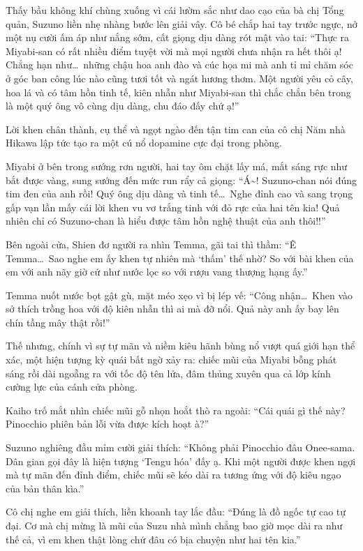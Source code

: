 \documentclass[../main.tex]{subfiles}
\begin{document}
Thấy bầu không khí chùng xuống vì cái lườm sắc như dao cạo của bà chị Tổng quản, Suzuno liền nhẹ nhàng bước lên giải vây. Cô bé chắp hai tay trước ngực, nở một nụ cười ấm áp như nắng sớm, cất giọng dịu dàng rót mật vào tai: ``Thực ra Miyabi-san có rất nhiều điểm tuyệt vời mà mọi người chưa nhận ra hết thôi ạ! Chẳng hạn như\dots\ những chậu hoa anh đào và cúc họa mi mà anh tỉ mỉ chăm sóc ở góc ban công lúc nào cũng tươi tốt và ngát hương thơm. Một người yêu cỏ cây, hoa lá và có tâm hồn tinh tế, kiên nhẫn như Miyabi-san thì chắc chắn bên trong là một quý ông vô cùng dịu dàng, chu đáo đấy chứ ạ!''

Lời khen chân thành, cụ thể và ngọt ngào đến tận tim can của cô chị Năm nhà Hikawa lập tức tạo ra một cú nổ dopamine cực đại trong phòng.

Miyabi ở bên trong sướng rơn người, hai tay ôm chặt lấy má, mắt sáng rực như bắt được vàng, sung sướng đến mức run rẩy cả giọng: ``Á\~{}! Suzuno-chan nói đúng tim đen của anh rồi! Quý ông dịu dàng và tinh tế\dots\ Nghe đỉnh cao và sang trọng gấp vạn lần mấy cái lời khen vu vơ trắng tinh với đỏ rực của hai tên kia! Quả nhiên chỉ có Suzuno-chan là hiểu được tâm hồn nghệ thuật của anh thôi!!''

Bên ngoài cửa, Shien đơ người ra nhìn Temma, gãi tai thì thầm: ``Ê Temma\dots\ Sao nghe em ấy khen tự nhiên mà `thấm' thế nhờ? So với bài khen của em với anh nãy giờ cứ như nước lọc so với rượu vang thượng hạng ấy.''

Temma nuốt nước bọt gật gù, mặt méo xẹo vì bị lép vế: ``Công nhận\dots\ Khen vào sở thích trồng hoa với độ kiên nhẫn thì ai mà đỡ nổi. Quả này anh ấy bay lên chín tầng mây thật rồi!''

Thế nhưng, chính vì sự tự mãn và niềm kiêu hãnh bùng nổ vượt quá giới hạn thể xác, một hiện tượng kỳ quái bất ngờ xảy ra: chiếc mũi của Miyabi bỗng phát sáng rồi dài ngoẵng ra với tốc độ tên lửa, đâm thủng xuyên qua cả lớp kính cường lực của cánh cửa phòng.


Kaiho trố mắt nhìn chiếc mũi gỗ nhọn hoắt thò ra ngoài: ``Cái quái gì thế này? Pinocchio phiên bản lỗi vừa được kích hoạt à?''

Suzuno nghiêng đầu mỉm cười giải thích: ``Không phải Pinocchio đâu Onee-sama. Dân gian gọi đây là hiện tượng `Tengu hóa' đấy ạ. Khi một người được khen ngợi mà tự mãn đến đỉnh điểm, chiếc mũi sẽ kéo dài ra tương ứng với độ kiêu ngạo của bản thân kìa.''

Cô chị nghe em giải thích, liền khoanh tay lắc đầu: ``Đúng là đồ ngốc tự cao tự đại. Cơ mà chị mừng là mũi của Suzu nhà mình chẳng bao giờ mọc dài ra như thế cả, vì em khen thật lòng chứ đâu có bịa chuyện như hai tên kia.''
\end{document}
